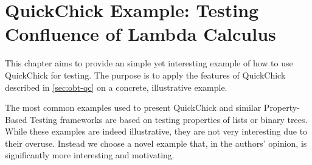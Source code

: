 \documentclass[twoside,11pt,openright]{report}
\newcommand{\pbt}{Property-Based Testing}
\begin{document}

\cleardoublepage
{}
 



\cleardoublepage
\appendix


\chapter{QuickChick Example: Testing Confluence of Lambda Calculus}
\label{ch:appendix-qc-example}
This chapter aims to provide an simple yet interesting example of how to use QuickChick for testing. The purpose is to apply the features of QuickChick described in \autoref{sec:obt-qc} on a concrete, illustrative example.

The most common examples used to present QuickChick and similar \pbt{} frameworks are based on testing properties of lists or binary trees. While these examples are indeed illustrative, they are not very interesting due to their overuse. Instead we choose a novel example that, in the authors' opinion, is significantly more interesting and motivating.
\end{document}
